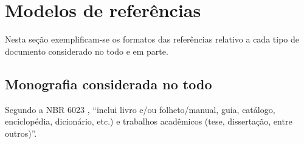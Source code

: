 \section{Modelos de referências}

Nesta seção exemplificam-se os formatos das referências relativo a cada tipo de documento considerado no todo e em parte.



\subsection{Monografia considerada no todo}

Segundo a NBR 6023 \cite[p.3]{NBR6023:2002}, ``inclui livro e/ou folheto/manual, guia, catálogo, enciclopédia, dicionário, etc.) e trabalhos acadêmicos (tese, dissertação, entre outros)''.

\begin{flushleft}
\end{flushleft}
 

